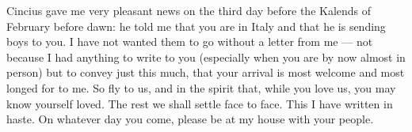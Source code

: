 

 Cincius gave me very pleasant news on the third day before the Kalends of February before dawn: he told me that you are in Italy and that he is sending boys to you. I have not wanted them to go without a letter from me --- not because I had anything to write to you (especially when you are by now almost in person) but to convey just this much, that your arrival is most welcome and most longed for to me. So fly to us, and in the spirit that, while you love us, you may know yourself loved. The rest we shall settle face to face. This I have written in haste. On whatever day you come, please be at my house with your people.

